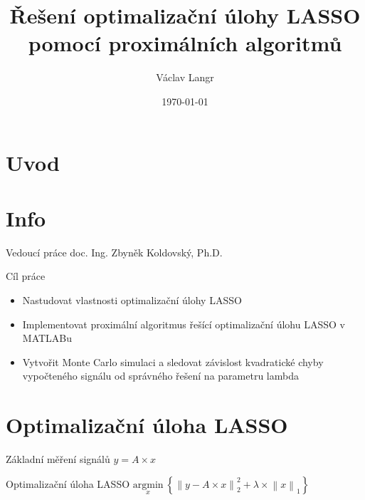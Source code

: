 


\title{Řešení optimalizační úlohy LASSO pomocí proximálních algoritmů}
%
\author{Václav Langr}
% 
\date{\today} %
\newcommand{\TextTitulniStranaPodLinkou}{\tiny
Studentská 2 {\color{FM_TUL} |} 461\,17 Liberec 2 {\color{FM_TUL} |} 
{vaclav.langr@tul.cz} {\color{FM_TUL} |} 
\href{http://www.fm.tul.cz/}{www.fm.tul.cz}}
 
\section{Uvod}
\begin{frame}[plain]
\titlepage
\end{frame}
\section{Info}
\begin{frame}
	\vfill
	\begin{block}{Vedoucí práce}
	    doc. Ing. Zbyněk Koldovský, Ph.D.
	\end{block}
	\begin{block}{Cíl práce}
    \begin{itemize}
        \item Nastudovat vlastnosti optimalizační úlohy LASSO
        \item Implementovat proximální algoritmus řešící optimalizační úlohu LASSO v MATLABu
        \item Vytvořit Monte Carlo simulaci a sledovat závislost kvadratické chyby vypočteného signálu od správného řešení na parametru lambda
      \end{itemize}
    \end{block}
\end{frame}
\section{Optimalizační úloha LASSO}
\vfill
\begin{frame}
	\vfill
	\begin{block}{Základní měření signálů}
	$y = A \times x$
	\end{block}
	\begin{block}{Optimalizační úloha LASSO}
		$\underset{x} {\mathrm{argmin}} ~\left\{\left\|y-A \times x\right\| ^2 _2+ \lambda \times \left\|x\right\|_1\right\}$
	\end{block}
\end{frame}
